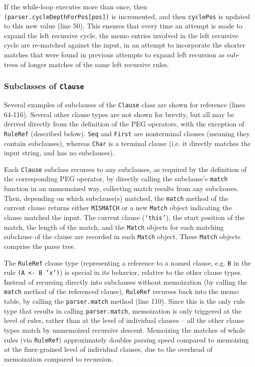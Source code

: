 \documentclass[manuscript]{acmart}
\begin{document}
If the while-loop executes more than once, then \texttt{(parser.cycleDepthForPos[pos])} is incremented, and then \texttt{cyclePos} is updated to this new value (line 50). This ensures that every time an attempt is made to expand the left recursive cycle, the memo entries involved in the left recursive cycle are re-matched against the input, in an attempt to incorporate the shorter matches that were found in previous attempts to expand left recursion as sub-trees of longer matches of the same left recursive rules.

\subsubsection{Subclasses of \texttt{Clause}}

Several examples of subclauses of the \texttt{Clause} class are shown for reference (lines 64-116). Several other clause types are not shown for brevity, but all may be derived directly from the definition of the PEG operators, with the exception of \texttt{RuleRef} (described below). \texttt{Seq} and \texttt{First} are nonterminal clauses (meaning they contain subclauses), whereas \texttt{Char} is a terminal clause (i.e. it directly matches the input string, and has no subclauses).

Each \texttt{Clause} subclass recurses to any subclauses, as required by the definition of the corresponding PEG operator, by directly calling the subclause's \texttt{match} function in an unmemoized way, collecting match results from any subclauses. Then, depending on which subclause(s) matched, the \texttt{match} method of the current clause returns either \texttt{MISMATCH} or a new \texttt{Match} object indicating the clause matched the input. The current clause (\texttt{`this'}), the start position of the match, the length of the match, and the \texttt{Match} objects for each matching subclause of the clause are recorded in each \texttt{Match} object. These \texttt{Match} objects comprise the parse tree.

The \texttt{RuleRef} clause type (representing a reference to a named clause, e.g. \texttt{B} in the rule \texttt{(A <- B 'x')}) is special in its behavior, relative to the other clause types. Instead of recursing directly into subclauses without memoization (by calling the \texttt{match} method of the referenced clause), \texttt{RuleRef} recurses back into the memo table, by calling the \texttt{parser.match} method (line 110). Since this is the only rule type that results in calling \texttt{parser.match}, memoization is only triggered at the level of rules, rather than at the level of individual clauses -- all the other clause types match by unmemoized recursive descent. Memoizing the matches of whole rules (via \texttt{RuleRef}) approximately doubles parsing speed compared to memoizing at the finer-grained level of individual clauses, due to the overhead of memoization compared to recursion.
\end{document}
